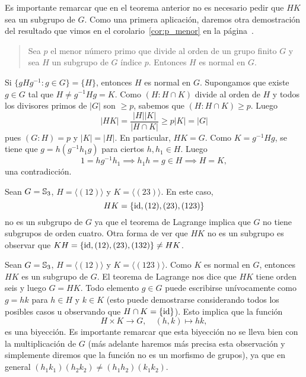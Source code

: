 Es importante remarcar que en el teorema anterior no es necesario pedir que $HK$ sea un subgrupo de $G$. 
Como una primera aplicación, daremos otra 
demostración del resultado que vimos en el corolario~\ref{cor:p_menor} en la página~\pageref{cor:p_menor}.

\begin{quote}
	Sea $p$ el menor número primo que divide al orden de un grupo finito  
	$G$ y sea $H$ un subgrupo de $G$ índice $p$. Entonces $H$ es normal en $G$. 
\end{quote}

Si $\{gHg^{-1}:g\in G\}=\{H\}$, entonces $H$ es normal en $G$. Supongamos que existe $g\in G$ tal que
$H\ne g^{-1}Hg=K$. Como $(H:H\cap K)$ divide al orden de $H$ y todos los divisores primos de $|G|$ son $\geq p$, sabemos que $(H:H\cap K)\geq p$. Luego
\[
|HK|=\frac{|H||K|}{|H\cap K|}\geq p|K|=|G|
\]
pues $(G:H)=p$ y $|K|=|H|$. En particular, $HK=G$. Como $K=g^{-1}Hg$, se tiene que 
$g=h(g^{-1}h_1g)$ para ciertos $h,h_1\in H$. Luego 
\[
1=hg^{-1}h_1\implies h_1h=g\in H\implies H=K,
\]
una contradicción.


\begin{example}
Sean $G=\mathbb{S}_3$, $H=\langle (12)\rangle$ y $K=\langle (23)\rangle$. En este caso, 
\[
HK=\{\operatorname{id},(12),(23),(123)\}
\]
no es un subgrupo de $G$ ya que el teorema de Lagrange implica que $G$ no 
tiene subgrupos de orden cuatro. Otra forma de ver que $HK$ no es un subgrupo 
es observar que $KH=\{\operatorname{id},(12),(23),(132)\}\ne HK$. 
\end{example}

\begin{example}
Sean $G=\mathbb{S}_3$, $H=\langle (12)\rangle$ y $K=\langle (123)\rangle$. 
Como $K$ es normal en $G$, entonces $HK$ es un subgrupo de $G$. El teorema
de Lagrange nos dice que $HK$ tiene orden seis y luego $G=HK$. 
Todo elemento $g\in G$ puede escribirse unívocamente como $g=hk$ para $h\in H$ y $k\in K$ (esto puede
demostrarse considerando todos los posibles casos u 
observando que $H\cap K=\{\operatorname{id}\}$). Esto implica que la función
\[
H\times K\to G,\quad 
(h,k)\mapsto hk,
\]
es una biyección. Es importante remarcar que esta biyección no se lleva bien 
con la multiplicación de $G$ (más adelante haremos más precisa esta observación y 
simplemente diremos que la función no es un morfismo de grupos), 
ya que en general $(h_1k_1)(h_2k_2)\ne (h_1h_2)(k_1k_2)$. 
\end{example}
